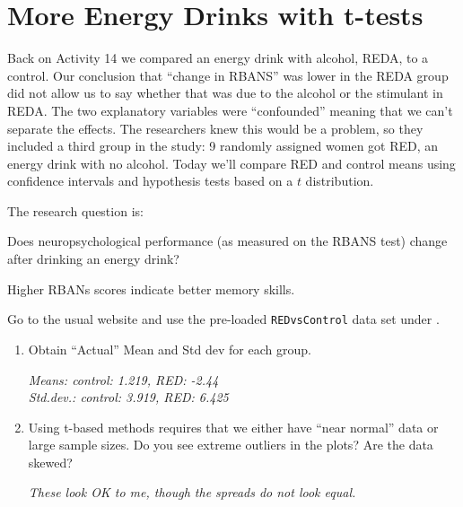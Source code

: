 \def\theTopic{Energy Drinks II}
\def\dayNum{25 }


\section{More Energy Drinks with t-tests}


Back on Activity 14 we compared an energy drink with
alcohol, REDA, to a control.  Our conclusion that ``change in RBANS''
was lower in the REDA group did not allow us to say whether that was
due to the alcohol 
or the stimulant in REDA.  The two  explanatory variables were
``confounded'' meaning that we can't separate the effects.  The
researchers knew this would be a problem, so they included a third
group in the study: 9 randomly assigned women got RED, an energy drink
with no alcohol.  Today we'll compare RED and control means using
confidence intervals and hypothesis tests based on a $t$
distribution. 

  The research question is: 

  {\sf
    Does neuropsychological performance (as measured on the RBANS
    test) change after drinking an energy drink? }

   Higher RBANs scores indicate better memory skills.

 Go to the usual website and use the pre-loaded {\tt REDvsControl}
 data set under .

  \begin{enumerate}
  \item  Obtain ``Actual'' Mean and Std dev for each group. 
\begin{students}
    \vspace{4cm}    
\end{students}

\begin{key}
  {\it Means:  control: 1.219, RED: -2.44 \\%
       Std.dev.: control: 3.919, RED: 6.425}%
\end{key}

\item Using t-based methods requires that we either have ``near
  normal'' data or  large sample sizes.  Do you see extreme outliers
  in the plots?  Are the data skewed?

\begin{students}
    \vspace{2cm}    
\end{students}

\begin{key}
  {\it  These look OK to me, though the spreads do not look equal.}
\end{key}

\end{enumerate}


